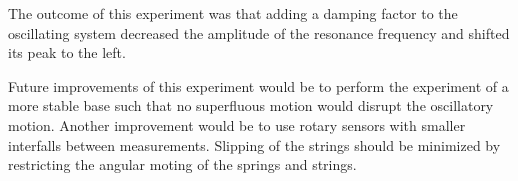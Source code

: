The outcome of this experiment was that adding a damping factor to the oscillating system decreased the amplitude of the resonance frequency and shifted its peak to the left.

Future improvements of this experiment would be to perform the experiment of a more stable base such that no superfluous motion would disrupt the oscillatory motion. Another improvement would be to use rotary sensors with smaller interfalls between measurements. Slipping of the strings should be minimized by restricting the angular moting of the springs and strings.
